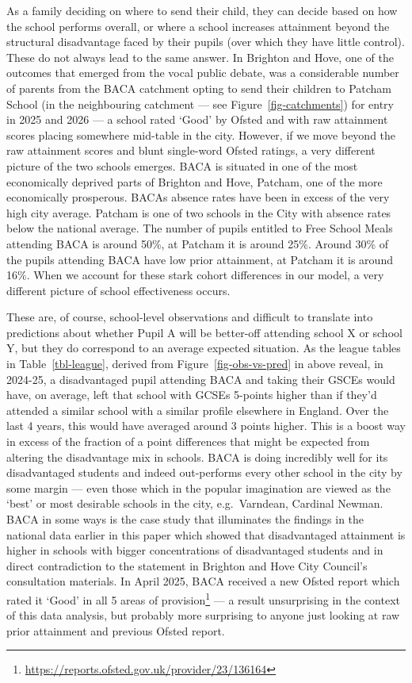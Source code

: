 \documentclass[
  12pt,
  titlepage]{article}
\begin{document}
As a family deciding on where to send their child, they can decide based
on how the school performs overall, or where a school increases
attainment beyond the structural disadvantage faced by their pupils
(over which they have little control). These do not always lead to the
same answer. In Brighton and Hove, one of the outcomes that emerged from
the vocal public debate, was a considerable number of parents from the
BACA catchment opting to send their children to Patcham School (in the
neighbouring catchment --- see Figure~\ref{fig-catchments}) for entry in
2025 and 2026 --- a school rated `Good' by Ofsted and with raw
attainment scores placing somewhere mid-table in the city. However, if
we move beyond the raw attainment scores and blunt single-word Ofsted
ratings, a very different picture of the two schools emerges. BACA is
situated in one of the most economically deprived parts of Brighton and
Hove, Patcham, one of the more economically prosperous. BACAs absence
rates have been in excess of the very high city average. Patcham is one
of two schools in the City with absence rates below the national
average. The number of pupils entitled to Free School Meals attending
BACA is around 50\%, at Patcham it is around 25\%. Around 30\% of the
pupils attending BACA have low prior attainment, at Patcham it is around
16\%. When we account for these stark cohort differences in our model, a
very different picture of school effectiveness occurs.

These are, of course, school-level observations and difficult to
translate into predictions about whether Pupil A will be better-off
attending school X or school Y, but they do correspond to an average
expected situation. As the league tables in Table~\ref{tbl-league},
derived from Figure~\ref{fig-obs-vs-pred} in above reveal, in 2024-25, a
disadvantaged pupil attending BACA and taking their GSCEs would have, on
average, left that school with GCSEs 5-points higher than if they'd
attended a similar school with a similar profile elsewhere in England.
Over the last 4 years, this would have averaged around 3 points higher.
This is a boost way in excess of the fraction of a point differences
that might be expected from altering the disadvantage mix in schools.
BACA is doing incredibly well for its disadvantaged students and indeed
out-performs every other school in the city by some margin --- even
those which in the popular imagination are viewed as the `best' or most
desirable schools in the city, e.g.~Varndean, Cardinal Newman. BACA in
some ways is the case study that illuminates the findings in the
national data earlier in this paper which showed that disadvantaged
attainment is higher in schools with bigger concentrations of
disadvantaged students and in direct contradiction to the statement in
Brighton and Hove City Council's consultation materials. In April 2025,
BACA received a new Ofsted report which rated it `Good' in all 5 areas
of provision\footnote{\url{https://reports.ofsted.gov.uk/provider/23/136164}}
--- a result unsurprising in the context of this data analysis, but
probably more surprising to anyone just looking at raw prior attainment
and previous Ofsted report.
\end{document}
